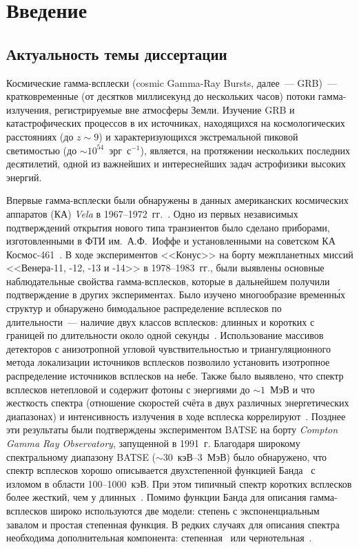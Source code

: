 \chapter*{Введение}					

\section*{Актуальность темы диссертации}

Космические гамма-всплески (cosmic Gamma-Ray Bursts, далее~--- GRB)~--- кратковременные 
(от десятков миллисекунд до нескольких часов) потоки гамма-излучения, регистрируемые вне атмосферы Земли. 
Изучение GRB и катастрофических процессов в их  источниках, находящихся на 
космологических расстояниях (до $z\sim9$) и характеризующихся экстремальной пиковой 
светимостью (до $\sim 10^{54}$~эрг~с$^{-1}$), является, на протяжении нескольких 
последних десятилетий, одной из важнейших и интереснейших задач астрофизики высоких энергий.        

Впервые гамма-всплески были обнаружены в данных американских космических 
аппаратов (КА) \textit{Vela} в 1967--1972~гг.~\citep{Klebesadel_1973ApJ}. 
Одно из первых независимых подтверждений открытия нового типа транзиентов 
было сделано приборами, изготовленными в ФТИ им.~А.Ф.~Иоффе и установленными 
на советском КА Космос-461~\citep{Mazets_1974PZETF_ru}. В ходе экспериментов <<Конус>> 
на борту межпланетных миссий <<Венера-11, -12, -13 и -14>> в 1978--1983~гг., были выявлены
основные наблюдательные свойства гамма-всплесков, которые в дальнейшем получили 
подтверждение в других экспериментах. Было изучено многообразие временн\'{ы}х структур
и обнаружено бимодальное распределение всплесков по длительности~--- 
наличие двух классов всплесков: длинных и коротких с границей по длительности 
около одной секунды~\citep{Mazets_1981_part_1}.
Использование массивов детекторов с анизотропной угловой чувствительностью
и триангуляционного метода локализации источников всплесков позволило установить 
изотропное распределение источников всплесков на небе. Также было выявлено,
что спектр всплесков нетепловой и содержит фотоны с энергиями до $\sim 1$~МэВ и 
что жесткость спектра (отношение скоростей счёта в двух различных энергетических диапазонах) 
и интенсивность излучения в ходе всплеска 
коррелируют~\citep{Mazets_1981_part_1,Golenetskii_1983Natur}.
Позднее эти результаты были подтверждены экспериментом BATSE на борту 
\textit{Compton Gamma Ray Observatory}, запущенной в 1991~г. 
Благодаря широкому спектральному диапазону BATSE ($\sim30$~кэВ--3~МэВ) было обнаружено, 
что спектр всплесков хорошо описывается двухстепенной функцией Банда~\citep{Band_1993ApJ} 
с изломом в области 100--1000~кэВ. При этом типичный спектр 
коротких всплесков более жесткий, чем у длинных~\citep{Kouveliotou_1993}. 
Помимо функции Банда для описания гамма-всплесков широко используются две модели:
степень с экспоненциальным завалом и простая степенная функция. В редких случаях 
для описания спектра необходима дополнительная компонента: 
степенная~\citep[см., например,][]{Abdo_2009ApJ} или чернотельная~\citep[см., например,][]{Guiriec_2011ApJ}.

